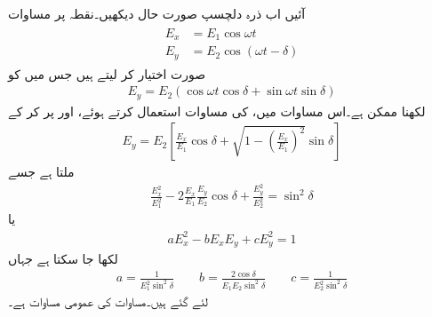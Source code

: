آئیں اب ذرہ دلچسپ صورت حال دیکھیں۔نقطہ  پر مساوات 
\begin{gather}
\begin{aligned}\label{مساوات_قطبیت_ابتدائی_نقطے_پر_میدان}
E_x&=E_1 \cos \omega t\\
E_y&=E_2 \cos (\omega t  -\delta)
\end{aligned}
\end{gather}
صورت اختیار کر لیتے ہیں جس میں  کو
\begin{align*}
E_y=E_2 \left(\cos \omega t \cos \delta + \sin \omega t \sin \delta\right)
\end{align*}
لکھنا ممکن ہے۔اس مساوات میں،   کی مساوات استعمال کرتے ہوئے،   اور  پر کر کے
\begin{align*}
E_y=E_2 \left[\frac{E_x}{E_1} \cos \delta+\sqrt{1-\left(\frac{E_x}{E_1}\right)^2} \sin \delta\right]
\end{align*}
ملتا ہے جسے
\begin{align}\label{مساوات_قطبیت_عمومی_بیضوی_قطبیت_الف}
\frac{E_x^2}{E_1^2}-2 \frac{E_x}{E_1} \frac{E_y}{E_2} \cos \delta +\frac{E_y^2}{E_2^2}=\sin^2 \delta
\end{align}
یا
\begin{align}\label{مساوات_قطبیت_عمومی_بیضوی_قطبیت_ب}
a E_x^2-b E_x E_y +c E_y^2=1
\end{align}
لکھا جا سکتا ہے جہاں
\begin{align}
a=\frac{1}{E_1^2 \sin^2 \delta} \quad \quad b=\frac{2 \cos \delta}{E_1 E_2 \sin^2 \delta} \quad \quad c=\frac{1}{E_2^2 \sin^2 \delta}
\end{align}
لئے گئے ہیں۔مساوات   کی عمومی مساوات ہے۔

